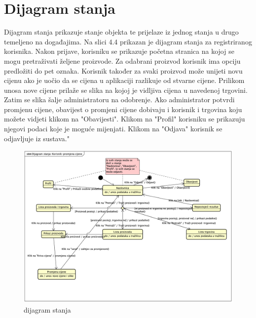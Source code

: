 			
			
			\eject
		
		\section{Dijagram stanja}
			
			
			
			
			Dijagram stanja prikazuje stanje objekta te prijelaze iz jednog stanja u drugo temeljeno na događajima. Na slici 4.4 prikazan je dijagram stanja za registriranog korisnika. Nakon prijave, korisniku se prikazuje početna stranica na kojoj se mogu pretraživati željene proizvode. Za odabrani proizvod korisnik ima opciju predložiti do pet oznaka. Korisnik također za svaki proizvod može unijeti novu cijenu ako je uočio da se cijena u aplikaciji razlikuje od stvarne cijene. Prilikom unosa nove cijene prilaže se slika na kojoj je vidljiva cijena u navedenoj trgovini. Zatim se slika šalje administratoru na odobrenje. Ako administrator potvrdi promjenu cijene, obavijest o promjeni cijene dobivaju i korisnik i trgovina koju možete vidjeti klikom na "Obavijesti". Klikom na "Profil" korisniku se prikazuju njegovi podaci koje je moguće mijenjati. Klikom na "Odjava" korisnik se odjavljuje iz sustava."
			
			\begin{figure}[H]
				\includegraphics[width=\textwidth]{slike/DijagramStanja.png} %
				\caption{dijagram stanja}
				\label{fig:dijagramStanja} %
			\end{figure}
			
